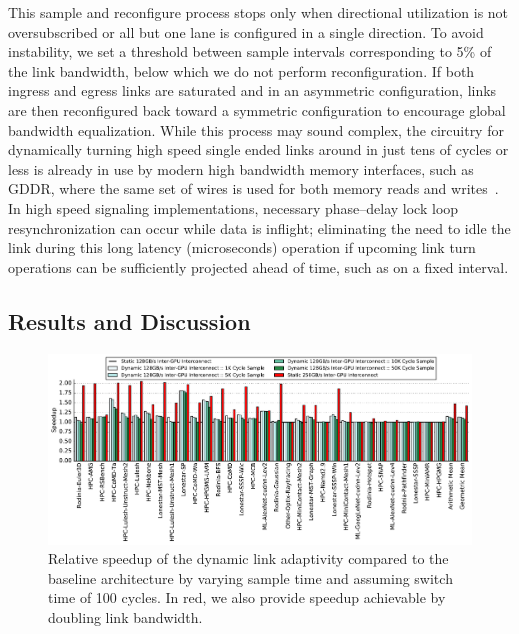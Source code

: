 This sample and 
reconfigure process stops only when directional utilization is not 
oversubscribed or all but one lane is configured in a single direction. 
To avoid instability, we set a threshold between 
sample intervals corresponding to 5\% of the link bandwidth, below which we do 
not perform reconfiguration.
If both ingress and egress links are saturated and in an asymmetric 
configuration, links are then reconfigured back toward a symmetric configuration 
to encourage global bandwidth equalization. While this process may sound 
complex, the circuitry for dynamically turning high speed single ended links 
around in just tens of cycles or less is already in use by modern high bandwidth 
memory interfaces, such as GDDR, where the same set of wires is used for both memory reads 
and writes~\cite{hynixgddr51Gb}. In high speed signaling implementations,
necessary phase--delay lock loop
resynchronization can occur while data is inflight; eliminating the need to idle
the link during this long latency (microseconds) operation if upcoming link turn operations
can be sufficiently projected ahead of time, such as on a fixed interval.

\subsection{Results and Discussion} 

\begin{figure}[tp]
	\centering
	\includegraphics[width=1.0\textwidth]{figures/plot_nvlink_sample_time.pdf}
	\caption{Relative speedup of the dynamic link adaptivity compared to
		the baseline architecture by varying sample time and assuming switch 
		time of
		100 cycles. In red, we also provide speedup achievable by doubling link 
		bandwidth.}
	\label{fig:sampletime}
	\vspace{-.1in}
\end{figure}

